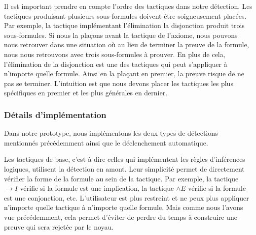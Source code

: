 \documentclass[titlepage,draft]{article}
\begin{document}
Il est important prendre en compte l'ordre des tactiques dans notre détection. Les tactiques produisant plusieurs sous-formules doivent être soigneusement placées. Par exemple, la tactique implémentant l'élimination la disjonction produit trois sous-formules. Si nous la plaçons avant la tactique de l'axiome, nous pouvons nous retrouver dans une situation où au lieu de terminer la preuve de la formule, nous nous retrouvons avec trois sous-formules à prouver. En plus de cela, l'élimination de la disjonction est une des tactiques qui peut s'appliquer à n'importe quelle formule. Ainsi en la plaçant en premier, la preuve risque de ne pas se terminer. L'intuition est que nous devons placer les tactiques les plus spécifiques en premier et les plus générales en dernier.

\subsubsection{Détails d'implémentation}
Dans notre prototype, nous implémentons les deux types de détections mentionnés précédemment ainsi que le déclenchement automatique.

Les tactiques de base, c'est-à-dire celles qui implémentent les règles d'inférences logiques, utilisent la détection en amont. Leur simplicité permet de directement vérifier la forme de la formule au sein de la tactique. Par exemple, la tactique $\to I$ vérifie si la formule est une implication, la tactique $\land E$ vérifie si la formule est une conjonction, etc. L'utilisateur est plus restreint et ne peux plus appliquer n'importe quelle tactique à n'importe quelle formule. Mais comme nous l'avons vue précédemment, cela permet d'éviter de perdre du temps à construire une preuve qui sera rejetée par le noyau.
\end{document}

